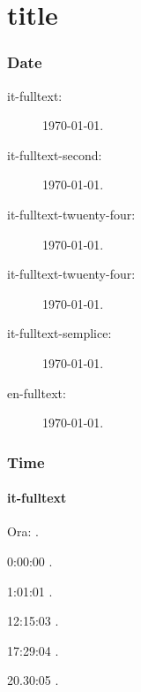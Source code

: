 \documentclass[italian,english]{article}
\begin{document}
\part{title}\section{Date}

\begin{description}
\item[it-fulltext:]
\today.\par 
\DTMnow
\item[it-fulltext-second:]
\today.\par
\DTMnow
\item[it-fulltext-twuenty-four:]
\today.\par
\DTMnow
\item[it-fulltext-twuenty-four:]
\today.\par
\DTMnow
\item[it-fulltext-semplice:]
\today.\par
\DTMnow
\item[en-fulltext:]
\today.\par
\DTMnow

\end{description}

\section{Time}
\subsection{it-fulltext}
Ora: \DTMcurrenttime.

0:00:00  .

1:01:01   . 

12:15:03   . 

17:29:04   . 

20.30:05   .
\end{document}
